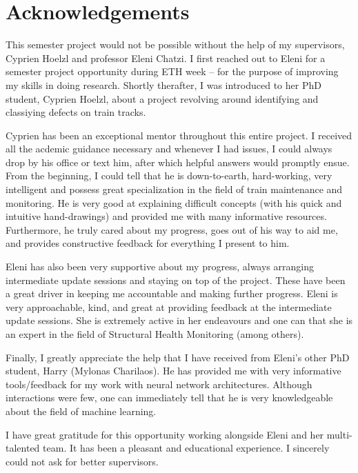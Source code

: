 \newpage
\chapter*{Acknowledgements}
This semester project would not be possible without the help of my supervisors, Cyprien Hoelzl and professor Eleni Chatzi. I first reached out to Eleni for a semester project opportunity during ETH week -- for the purpose of improving my skills in doing research. Shortly therafter, I was introduced to her PhD student, Cyprien Hoelzl, about a project revolving around identifying and classiying defects on train tracks.

Cyprien has been an exceptional mentor throughout this entire project. I received all the acdemic guidance necessary and whenever I had issues, I could always drop by his office or text him, after which helpful answers would promptly ensue. From the beginning, I could tell that he is down-to-earth, hard-working, very intelligent and possess great specialization in the field of train maintenance and monitoring. He is very good at explaining difficult concepts (with his quick and intuitive hand-drawings) and provided me with many informative resources. Furthermore, he truly cared about my progress, goes out of his way to aid me, and provides constructive feedback for everything I present to him. 

Eleni has also been very supportive about my progress, always arranging intermediate update sessions and staying on top of the project. These have been a great driver in keeping me accountable and making further progress. Eleni is very approachable, kind, and great at providing feedback at the intermediate update sessions. She is extremely active in her endeavours and one can that she is an expert in the field of Structural Health Monitoring (among others).

Finally, I greatly appreciate the help that I have received from Eleni's other PhD student, Harry (Mylonas Charilaos). He has provided me with very informative tools/feedback for my work with neural network architectures. Although interactions were few, one can immediately tell that he is very knowledgeable about the field of machine learning.
 
I have great gratitude for this opportunity working alongside Eleni and her multi-talented team. It has been a pleasant and educational experience. I sincerely could not ask for better supervisors.


\newpage



